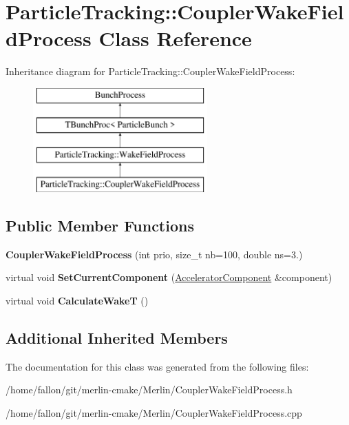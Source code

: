 \hypertarget{classParticleTracking_1_1CouplerWakeFieldProcess}{}\section{Particle\+Tracking\+:\+:Coupler\+Wake\+Field\+Process Class Reference}
\label{classParticleTracking_1_1CouplerWakeFieldProcess}
Inheritance diagram for Particle\+Tracking\+:\+:Coupler\+Wake\+Field\+Process\+:\begin{figure}[H]
\begin{center}
\leavevmode
\includegraphics[height=4.000000cm]{classParticleTracking_1_1CouplerWakeFieldProcess}
\end{center}
\end{figure}
\subsection*{Public Member Functions}
\begin{DoxyCompactItemize}
\item 
\mbox{\label{classParticleTracking_1_1CouplerWakeFieldProcess_a8f0b330d2bb20b06f3814c1bcd3e759d}} 
{\bfseries Coupler\+Wake\+Field\+Process} (int prio, size\+\_\+t nb=100, double ns=3.)
\item 
\mbox{\label{classParticleTracking_1_1CouplerWakeFieldProcess_a3c438187fd0e8b61073ca5dbac2c938d}} 
virtual void {\bfseries Set\+Current\+Component} (\hyperlink{classAcceleratorComponent}{Accelerator\+Component} \&component)
\item 
\mbox{\label{classParticleTracking_1_1CouplerWakeFieldProcess_a035ec04f75196141d68da7430196b5f0}} 
virtual void {\bfseries Calculate\+WakeT} ()
\end{DoxyCompactItemize}
\subsection*{Additional Inherited Members}


The documentation for this class was generated from the following files\+:\begin{DoxyCompactItemize}
\item 
/home/fallon/git/merlin-\/cmake/\+Merlin/Coupler\+Wake\+Field\+Process.\+h\item 
/home/fallon/git/merlin-\/cmake/\+Merlin/Coupler\+Wake\+Field\+Process.\+cpp\end{DoxyCompactItemize}
